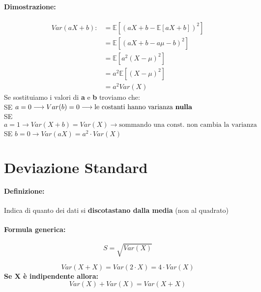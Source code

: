\documentclass[]{article}
\newcommand{\ev}{\mathbb{E}[X]}
\renewcommand{\ev}[1]{\mathbb{E}[#1]}
\newcommand{\definizione}{\paragraph{Definizione:}}
\newcommand{\formula}{\paragraph{Formula generica:}}
\begin{document}
    \paragraph{Dimostrazione:}
    \begin{equation*}
        \begin{split}
            Var(aX + b) :&= \ev{(aX + b - \ev{aX + b})^2} \\
            & = \ev{(aX + b -a\mu - b)^2} \\
            & = \ev{a^2(X-\mu)^2} \\
            & = a^2 \ev{(X - \mu)^2} \\
            & = a^2 Var(X)
        \end{split}
    \end{equation*}
    Se sostituiamo i valori di \textbf{a} e \textbf{b} troviamo che: \\
    SE $a = 0 \longrightarrow Var(b) = 0 \longrightarrow \text{le costanti hanno varianza \textbf{nulla}}$ \\
    SE $a = 1 \longrightarrow Var(X + b) = Var(X) \longrightarrow \text{sommando una const. non cambia la varianza}$ \\
    SE $b = 0 \longrightarrow Var(aX) = a^2 \cdot Var(X)$ \\
    

    \newpage
    \section{Deviazione Standard}
    \definizione Indica di quanto dei dati si \textbf{discotastano dalla media} (non al quadrato)

    \formula \[ S = \sqrt{Var(X)} \]

    \[ Var(X + X) = Var(2 \cdot X) = 4 \cdot Var(X) \]
    \linebreak[1]
    \textbf{Se X è indipendente allora:}
    \[ Var(X) + Var(X) = Var(X + X) \]

    \newpage
\end{document}
